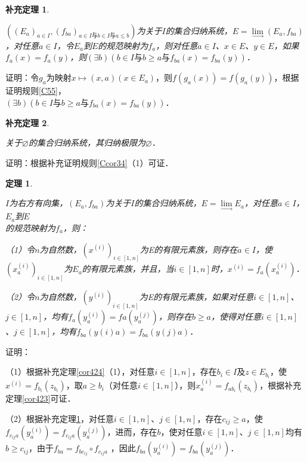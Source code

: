 \documentclass[12pt, a4paper, oneside]{book}
\newtheorem{theo}{定理}
\newtheorem{cor}{补充定理}
\begin{document}
			\begin{cor}\label{cor425}
				\hfill\par
				$((E_a)_{a\in I}, (f_{ba})_{a\in I\text{与}b\in I\text{与}a\leq b})$为关于$I$的集合归纳系统，$E=\lim\limits_\to (E_a, f_{ba})$，对任意$a\in I$，令$E_a$到$E$的规范映射为$f_a$，则对任意$a\in I$、$x\in E$、$y\in E$，如果$f_a(x)=f_a (y)$，则$(\exists b)(b\in I\text{与}b\geq a\text{与}f_{ba}(x)= f_{ba}(y))$．
			\end{cor}
			证明：令$g_a$为映射$x\mapsto (x, a)(x\in E_a)$，则$f(g_a(x))=f(g_a(y))$，根据证明规则\ref{C55}，\\$(\exists b)(b\in I\text{与}b\geq a\text{与}f_{ba}(x)= f_{ba}(y))$．
			
			\begin{cor}\label{cor426}
				\hfill\par
				关于$\varnothing$的集合归纳系统，其归纳极限为$\varnothing$．
			\end{cor}
			证明：根据补充证明规则\ref{Ccor34}（1）可证．
					
			\begin{theo}\label{theo183}
				\hfill\par
				$I$为右方有向集，$(E_a, f_{ba})$为关于$I$的集合归纳系统，$E= \lim\limits_\to E_a$，对任意$a\in I$，$E_a$到$E$\\的规范映射为$f_a$，则：
				\par
				（1）令$n$为自然数，$(x^{(i)})_{i\in [1, n]}$为E的有限元素族，则存在$a\in I$，使$(x^{(i)}_a)_{i\in [1, n]}$为$E_a$的有限元素族，并且，当$i\in [1, n]$时，$x^{(i)}=f_a(x^{(i)}_a)$．
				\par
				（2）令$n$为自然数，$(y^{(i)})_{i\in [1, n]}$为E的有限元素族，如果对任意$i\in [1, n]$、$j\in [1, n]$，均有$f_a(y^{(i)}_a)=fa(y^{(j)}_a)$，则存在$b\geq a$，使得对任意$i\in [1, n]$、$j\in [1, n]$，均有$f_{ba}(y(i)a)=f_{ba}(y(j)a)$．
			\end{theo}
			证明：
			\par
			（1）根据补充定理\ref{cor424}（1），对任意$i\in [1, n]$，存在$b_i\in I$及$z\in E_{b_i}$，使$x^{(i)}=f_{b_i}(z_{b_i})$，取$a\geq b_i$（对任意$i\in [1, n]$），则$x^{(i)}_a=f_{a b_i}(z_{b_i})$，根据补充定理\ref{cor423}可证．
			\par
			（2）根据补充定理\ref{cor425}，对任意$i\in [1, n]$、$j\in [1, n]$，存在$c_{ij}\geq a$，使$f_{c_{ij} a}(y^{(i)}_a)=f_{c_{ij} a}(y^{(j)}_a)$，进而，存在$b$，使对任意$i\in [1, n]$、$j\in [1, n]$均有$b\geq c_{ij}$，由于$f_{ba} =f_{b c_{ij}}\circ f_{c_{ij} a}$ ，因此$f_{ba}(y^{(i)}_a)=f_{ba}(y^{(j)}_a)$．
					
\end{document}
